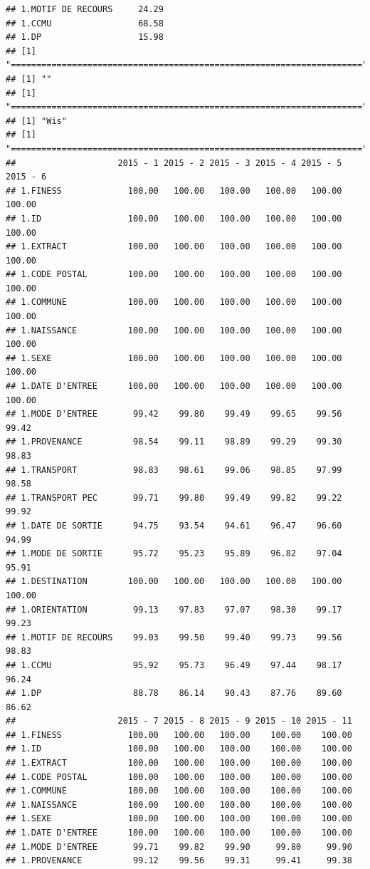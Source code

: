 \documentclass[]{article}
\begin{document}
\begin{verbatim}
## 1.MOTIF DE RECOURS     24.29
## 1.CCMU                 68.58
## 1.DP                   15.98
## [1] "====================================================================="
## [1] ""
## [1] "====================================================================="
## [1] "Wis"
## [1] "====================================================================="
##                    2015 - 1 2015 - 2 2015 - 3 2015 - 4 2015 - 5 2015 - 6
## 1.FINESS             100.00   100.00   100.00   100.00   100.00   100.00
## 1.ID                 100.00   100.00   100.00   100.00   100.00   100.00
## 1.EXTRACT            100.00   100.00   100.00   100.00   100.00   100.00
## 1.CODE POSTAL        100.00   100.00   100.00   100.00   100.00   100.00
## 1.COMMUNE            100.00   100.00   100.00   100.00   100.00   100.00
## 1.NAISSANCE          100.00   100.00   100.00   100.00   100.00   100.00
## 1.SEXE               100.00   100.00   100.00   100.00   100.00   100.00
## 1.DATE D'ENTREE      100.00   100.00   100.00   100.00   100.00   100.00
## 1.MODE D'ENTREE       99.42    99.80    99.49    99.65    99.56    99.42
## 1.PROVENANCE          98.54    99.11    98.89    99.29    99.30    98.83
## 1.TRANSPORT           98.83    98.61    99.06    98.85    97.99    98.58
## 1.TRANSPORT PEC       99.71    99.80    99.49    99.82    99.22    99.92
## 1.DATE DE SORTIE      94.75    93.54    94.61    96.47    96.60    94.99
## 1.MODE DE SORTIE      95.72    95.23    95.89    96.82    97.04    95.91
## 1.DESTINATION        100.00   100.00   100.00   100.00   100.00   100.00
## 1.ORIENTATION         99.13    97.83    97.07    98.30    99.17    99.23
## 1.MOTIF DE RECOURS    99.03    99.50    99.40    99.73    99.56    98.83
## 1.CCMU                95.92    95.73    96.49    97.44    98.17    96.24
## 1.DP                  88.78    86.14    90.43    87.76    89.60    86.62
##                    2015 - 7 2015 - 8 2015 - 9 2015 - 10 2015 - 11
## 1.FINESS             100.00   100.00   100.00    100.00    100.00
## 1.ID                 100.00   100.00   100.00    100.00    100.00
## 1.EXTRACT            100.00   100.00   100.00    100.00    100.00
## 1.CODE POSTAL        100.00   100.00   100.00    100.00    100.00
## 1.COMMUNE            100.00   100.00   100.00    100.00    100.00
## 1.NAISSANCE          100.00   100.00   100.00    100.00    100.00
## 1.SEXE               100.00   100.00   100.00    100.00    100.00
## 1.DATE D'ENTREE      100.00   100.00   100.00    100.00    100.00
## 1.MODE D'ENTREE       99.71    99.82    99.90     99.80     99.90
## 1.PROVENANCE          99.12    99.56    99.31     99.41     99.38

\end{verbatim}
\end{document}
